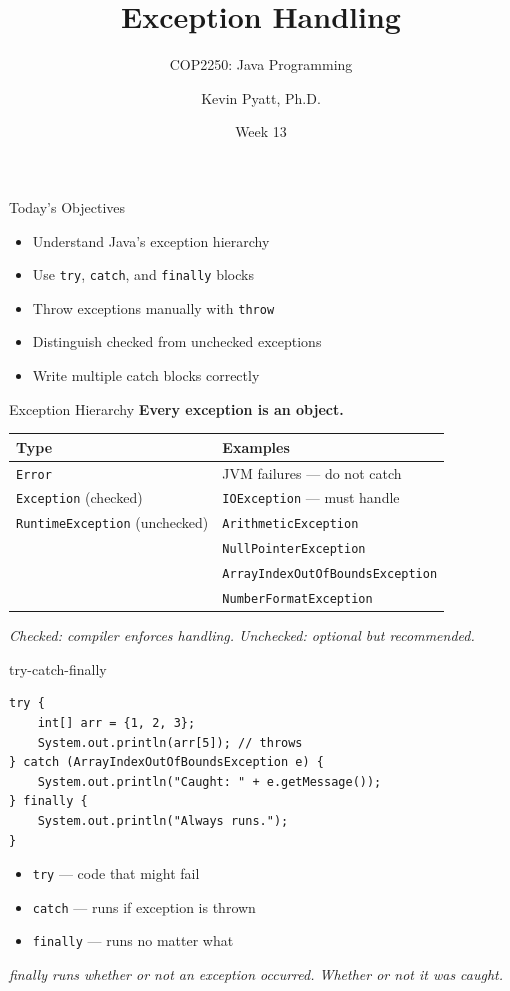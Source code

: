 \documentclass{beamer}
\title[Exception Handling]{Exception Handling}
\subtitle{COP2250: Java Programming}
\author{Kevin Pyatt, Ph.D.}
\institute{State College of Florida \\ Pyatt Labs}
\date{Week 13}
\begin{document}
\begin{frame}
  \titlepage
\end{frame}
\begin{frame}{Today's Objectives}
\begin{itemize}
  \item Understand Java's exception hierarchy
  \item Use \texttt{try}, \texttt{catch}, and \texttt{finally} blocks
  \item Throw exceptions manually with \texttt{throw}
  \item Distinguish checked from unchecked exceptions
  \item Write multiple catch blocks correctly
\end{itemize}
\end{frame}
\begin{frame}{Exception Hierarchy}
\textbf{Every exception is an object.}
\vspace{0.3cm}
\begin{tabular}{ll}
\toprule
\textbf{Type} & \textbf{Examples} \\
\midrule
\texttt{Error} & JVM failures --- do not catch \\
\texttt{Exception} (checked) & \texttt{IOException} --- must handle \\
\texttt{RuntimeException} (unchecked) & \texttt{ArithmeticException} \\
& \texttt{NullPointerException} \\
& \texttt{ArrayIndexOutOfBoundsException} \\
& \texttt{NumberFormatException} \\
\bottomrule
\end{tabular}
\vspace{0.3cm}
\textit{Checked: compiler enforces handling. Unchecked: optional but recommended.}
\end{frame}
\begin{frame}[fragile]{try-catch-finally}
\begin{lstlisting}
try {
    int[] arr = {1, 2, 3};
    System.out.println(arr[5]); // throws
} catch (ArrayIndexOutOfBoundsException e) {
    System.out.println("Caught: " + e.getMessage());
} finally {
    System.out.println("Always runs.");
}
\end{lstlisting}
\vspace{0.3cm}
\begin{itemize}
  \item \texttt{try} --- code that might fail
  \item \texttt{catch} --- runs if exception is thrown
  \item \texttt{finally} --- runs no matter what
\end{itemize}
\vspace{0.2cm}
\textit{finally runs whether or not an exception occurred. Whether or not it was caught.}
\end{frame}
\end{document}
